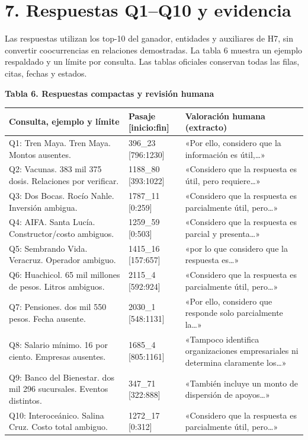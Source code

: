 \documentclass[11pt,a4paper]{article}
\begin{document}
\section*{7. Respuestas Q1–Q10 y evidencia}
\par
Las respuestas utilizan los top-10 del ganador, entidades y auxiliares de H7, sin convertir coocurrencias en relaciones demostradas. La tabla 6 muestra un ejemplo respaldado y un límite por consulta. Las tablas oficiales conservan todas las filas, citas, fechas y estados.
\par
\par\medskip\noindent\begin{minipage}{\linewidth}
\textbf{Tabla 6. Respuestas compactas y revisión humana}\par\smallskip
\begin{tabularx}{\linewidth}{@{}YYY@{}}\toprule
Consulta, ejemplo y límite & Pasaje [inicio:fin] & Valoración humana (extracto) \\ \midrule
Q1: Tren Maya. Tren Maya. Montos ausentes. & 396\_\allowbreak{}23 [796:1230] & «Por ello, considero que la información es útil,…» \\
Q2: Vacunas. 383 mil 375 dosis. Relaciones por verificar. & 1188\_\allowbreak{}80 [393:1022] & «Considero que la respuesta es útil, pero requiere…» \\
Q3: Dos Bocas. Rocío Nahle. Inversión ambigua. & 1787\_\allowbreak{}11 [0:259] & «Considero que la respuesta es parcialmente útil, pero…» \\
Q4: AIFA. Santa Lucía. Constructor/\allowbreak{}costo ambiguos. & 1259\_\allowbreak{}59 [0:503] & «Considero que la respuesta es parcial y presenta…» \\
Q5: Sembrando Vida. Veracruz. Operador ambiguo. & 1415\_\allowbreak{}16 [157:657] & «por lo que considero que la respuesta es…» \\
Q6: Huachicol. 65 mil millones de pesos. Litros ambiguos. & 2115\_\allowbreak{}4 [592:924] & «Considero que la respuesta es parcialmente útil, pero…» \\
Q7: Pensiones. dos mil 550 pesos. Fecha ausente. & 2030\_\allowbreak{}1 [548:1131] & «Por ello, considero que responde solo parcialmente la…» \\
Q8: Salario mínimo. 16 por ciento. Empresas ausentes. & 1685\_\allowbreak{}4 [805:1161] & «Tampoco identifica organizaciones empresariales ni determina claramente los…» \\
Q9: Banco del Bienestar. dos mil 296 sucursales. Eventos distintos. & 347\_\allowbreak{}71 [322:888] & «También incluye un monto de dispersión de apoyos…» \\
Q10: Interoceánico. Salina Cruz. Costo total ambiguo. & 1272\_\allowbreak{}17 [0:312] & «Considero que la respuesta es parcialmente útil, pero…» \\
\bottomrule\end{tabularx}\end{minipage}\par\medskip
\end{document}
